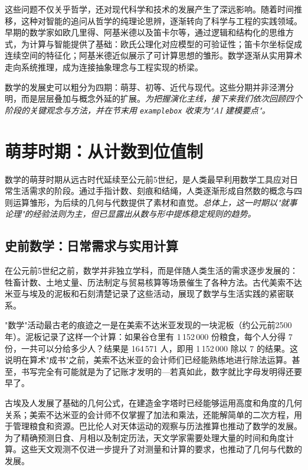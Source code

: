 这些问题不仅关乎哲学，还对现代科学和技术的发展产生了深远影响。随着时间推移，这种对智能的追问从哲学的纯理论思辨，逐渐转向了科学与工程的实践领域。早期的数学家如欧几里得、阿基米德以及笛卡尔等，通过逻辑和结构化的思维方式，为计算与智能提供了基础：欧氏公理化对应模型的可验证性；笛卡尔坐标促成连续空间的特征化；阿基米德近似展示了可计算思想的雏形。数学逐渐从实用算术走向系统推理，成为连接抽象理念与工程实现的桥梁。

数学的发展史可以粗分为四期：萌芽、初等、近代与现代。这些分期并非泾渭分明，而是层层叠加与概念外延的扩展。\emph{为把握演化主线，接下来我们依次回顾四个阶段的关键观念与方法，并在节末用 \texttt{examplebox} 收束为"AI 建模要点"。}

\section{萌芽时期：从计数到位值制}


数学的萌芽时期从远古时代延续至公元前5世纪，是人类最早利用数学工具应对日常生活需求的阶段。通过手指计数、刻痕和结绳，人类逐渐形成自然数的概念与四则运算雏形，为后续的几何与代数提供了素材和直觉。\emph{总体上，这一时期以"就事论理"的经验法则为主，但已显露出从数与形中提炼稳定规则的趋势。}

\subsection{史前数学：日常需求与实用计算}


在公元前5世纪之前，数学并非独立学科，而是伴随人类生活的需求逐步发展的：牲畜计数、土地丈量、历法制定与贸易核算等场景催生了各种方法。古代美索不达米亚与埃及的泥板和石刻清楚记录了这些活动，展现了数学与生活实践的紧密联系。

"数学"活动最古老的痕迹之一是在美索不达米亚发现的一块泥板（约公元前2500年）。泥板记录了这样一个计算：如果谷仓里有 1\,152\,000 份粮食，每个人分得 7 份，一共可以分给多少人？结果是 164\,571 人，即用 1\,152\,000 除以 7 的结果。这说明在算术"成书"之前，美索不达米亚的会计师们已经能熟练地进行除法运算。甚至，书写完全有可能就是为了记账才发明的---若真如此，数字就比字母发明得还要早了。

古埃及人发展了基础的几何公式，在建造金字塔时已经能够运用高度和角度的几何关系；美索不达米亚的会计师不仅掌握了加法和乘法，还能解简单的二次方程，用于管理粮食和资源。巴比伦人对天体运动的观察与历法推算也推动了数学的发展。为了精确预测日食、月相以及制定历法，天文学家需要处理大量的时间和角度计算。这些天文观测不仅进一步提升了对测量和计算的要求，也推动了几何与代数的发展。

